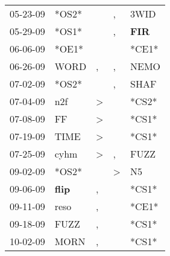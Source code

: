 \begin{supertabular}{p{0.07\textwidth}p{0.06\textwidth}p{0.02\textwidth}p{0.02\textwidth}p{0.06\textwidth}}
          05-23-09\textsuperscript{} &                            *OS2* &                  &                , &           3WID\textsuperscript{} \\
          05-29-09\textsuperscript{} &                            *OS1* &                  &                , &   \textbf{FIR\textsuperscript{}} \\
          06-06-09\textsuperscript{} &                            *OE1* &                  &                  &                            *CE1* \\
          06-26-09\textsuperscript{} &           WORD\textsuperscript{} &                , &                , &           NEMO\textsuperscript{} \\
          07-02-09\textsuperscript{} &                            *OS2* &                  &                , &           SHAF\textsuperscript{} \\
          07-04-09\textsuperscript{} &            n2f\textsuperscript{} &     \textgreater &                  &                            *CS2* \\
          07-08-09\textsuperscript{} &             FF\textsuperscript{} &     \textgreater &                  &                            *CS1* \\
          07-19-09\textsuperscript{} &           TIME\textsuperscript{} &     \textgreater &                  &                            *CS1* \\
          07-25-09\textsuperscript{} &           cyhm\textsuperscript{} &     \textgreater &                , &           FUZZ\textsuperscript{} \\
          09-02-09\textsuperscript{} &                            *OS2* &                  &     \textgreater &             N5\textsuperscript{} \\
          09-06-09\textsuperscript{} &  \textbf{flip\textsuperscript{}} &                , &                  &                            *CS1* \\
          09-11-09\textsuperscript{} &           reso\textsuperscript{} &                , &                  &                            *CE1* \\
          09-18-09\textsuperscript{} &           FUZZ\textsuperscript{} &                , &                  &                            *CS1* \\
          10-02-09\textsuperscript{} &           MORN\textsuperscript{} &                , &                  &                            *CS1* \\

\end{supertabular}
